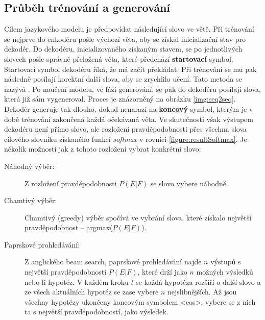 \subsection{Průběh trénování a generování}

Cílem jazykového modelu je předpovídat následující slovo ve větě. Při trénování se nejprve do enkodéru pošle výchozí věta, aby se získal inicializační stav pro dekodér. Do dekodéru, inicializovaného získaným stavem, se po jednotlivých slovech pošle správně přeložená věta, které předchází \textbf{startovací} symbol. Startovací symbol dekodéru říká, že má začít překládat. Při trénování se mu pak následně posílají korektní další slova, aby se zrychlilo učení. Tato metoda se nazývá . Po naučení modelu, ve fázi generování, se pak do dekodéru posílají slova, která již sám vygeneroval. Proces je znázorněný na obrázku \ref{img:seq2seq}. Dekodér generuje tak dlouho, dokud nenarazí na \textbf{koncový} symbol, kterým je v době trénování zakončená každá očekávaná věta. Ve skutečnosti však výstupem dekodéru není přímo slovo, ale rozložení pravděpodobnosti přes všechna slova cílového slovníku získaného funkcí \emph{softmax} v rovnici \ref{figure:resultSoftmax}. Je několik možností jak z tohoto rozložení vybrat konkrétní slovo:

\begin{description}
  \item[Náhodný výběr:] Z rozložení pravděpodobnosti $P(E|F)$ se slovo vybere náhodně.
  \item[Chamtivý výběr:] Chamtivý (greedy) výběr spočívá ve vybrání slova, které získalo největší pravděpodobnost -- argmax($P(E|F)$).
  \item[Paprskové prohledávání:] Z anglického beam search, paprskové prohledávání najde $n$ výstupů s největší pravděpodobností $P(E|F)$, které drží jako $n$ možných výsledků nebo-li hypotéz. V každém kroku $t$ se každá hypotéza rozšíří o další slovo a ze všech aktuálních hypotéz se zase vybere $n$ nejslibnějších. Až jsou všechny hypotézy ukončeny koncovým symbolem <eos>, vybere se z nich ta s největší pravděpodobností, jako výsledek.
\end{description}


